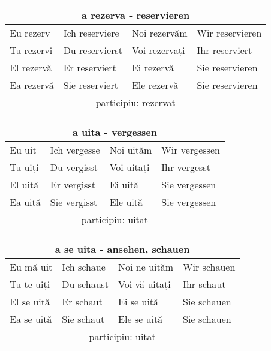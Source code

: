 \documentclass[11pt, oneside]{article}
\begin{document}
%
\begin{center}
  \begin{tabular}{ |p{3.25cm}|p{3.25cm}||p{3.25cm}|p{3.25cm}| }
      \hline
      \multicolumn{4}{|c|}{a rezerva - reservieren} \\
      \hline
      \hline
      Eu rezerv & Ich reserviere & Noi rezervăm & Wir reservieren\\
      \hline
      Tu rezervi & Du reservierst & Voi rezervați & Ihr reserviert\\
      \hline
      El rezervă & Er reserviert & Ei rezervă & Sie reservieren\\ 
      Ea rezervă & Sie reserviert & Ele rezervă & Sie reservieren\\
      \hline
      \multicolumn{4}{|c|}{participiu: rezervat} \\
      \hline
     \end{tabular}
\end{center}
%
\begin{center}
  \begin{tabular}{ |p{3.25cm}|p{3.25cm}||p{3.25cm}|p{3.25cm}| }
      \hline
      \multicolumn{4}{|c|}{a uita - vergessen} \\
      \hline
      \hline
      Eu uit & Ich vergesse & Noi uităm & Wir vergessen\\
      \hline
      Tu uiți & Du vergisst & Voi uitați & Ihr vergesst\\
      \hline
      El uită & Er vergisst & Ei uită & Sie vergessen\\ 
      Ea uită & Sie vergisst & Ele uită & Sie vergessen\\
      \hline
      \multicolumn{4}{|c|}{participiu: uitat} \\
      \hline
     \end{tabular}
\end{center}
%
\begin{center}
  \begin{tabular}{ |p{3.25cm}|p{3.25cm}||p{3.25cm}|p{3.25cm}| }
      \hline
      \multicolumn{4}{|c|}{a se uita - ansehen, schauen} \\
      \hline
      \hline
      Eu mă uit & Ich schaue & Noi ne uităm & Wir schauen\\
      \hline
      Tu te uiți & Du schaust & Voi vă uitați & Ihr schaut\\
      \hline
      El se uită & Er schaut & Ei se uită & Sie schauen\\ 
      Ea se uită & Sie schaut & Ele se uită & Sie schauen\\
      \hline
      \multicolumn{4}{|c|}{participiu: uitat} \\
      \hline
     \end{tabular}
\end{center}
\end{document}
